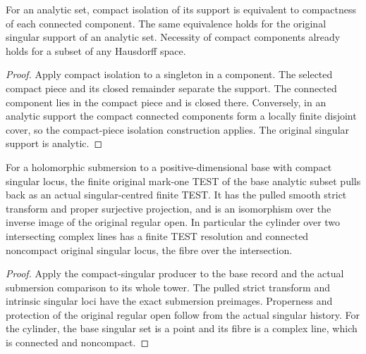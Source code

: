 \begin{proposition}
\label{hir:g8-compact-isolation-characterization}
\leanok
For an analytic set, compact isolation of its support is equivalent to
compactness of each connected component. The same equivalence holds
for the original singular support of an analytic set. Necessity of
compact components already holds for a subset of any Hausdorff space.
\end{proposition}
\begin{proof}
Apply compact isolation to a singleton in a component. The selected
compact piece and its closed remainder separate the support. The
connected component lies in the compact piece and is closed there.
Conversely, in an analytic support the compact connected components
form a locally finite disjoint cover, so the compact-piece isolation
construction applies. The original singular support is analytic.
\end{proof}

\begin{theorem}
\label{hir:g8-compact-base-submersion-test}
\leanok
For a holomorphic submersion to a positive-dimensional base with
compact singular locus, the finite original mark-one TEST of the base
analytic subset pulls back as an actual singular-centred finite TEST.
It has the pulled smooth strict transform and proper surjective
projection, and is an isomorphism over the inverse image of the
original regular open. In particular the cylinder over two intersecting
complex lines has a finite TEST resolution and connected noncompact
original singular locus, the fibre over the intersection.
\end{theorem}
\begin{proof}
Apply the compact-singular producer to the base record and the actual
submersion comparison to its whole tower. The pulled strict transform
and intrinsic singular loci have the exact submersion preimages.
Properness and protection of the original regular open follow from the
actual singular history. For the cylinder, the base singular set is a
point and its fibre is a complex line, which is connected and
noncompact.
\end{proof}

